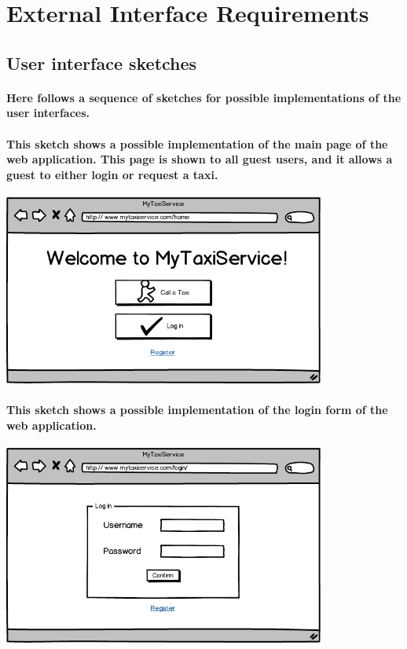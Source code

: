 \section{External Interface Requirements}
\subsection{User interface sketches}
\paragraph{Here follows a sequence of sketches for possible implementations of the user interfaces.}
\begin{center}
\paragraph{This sketch shows a possible implementation of the main page of the web application. This page is shown to all guest users, and it allows a guest to either login or request a taxi.}
\includegraphics[width=300pt,keepaspectratio]{images/guest_home.png}
\paragraph{This sketch shows a possible implementation of the login form of the web application.}
\includegraphics[width=300pt,keepaspectratio]{images/guest_login.png}

\end{center}
